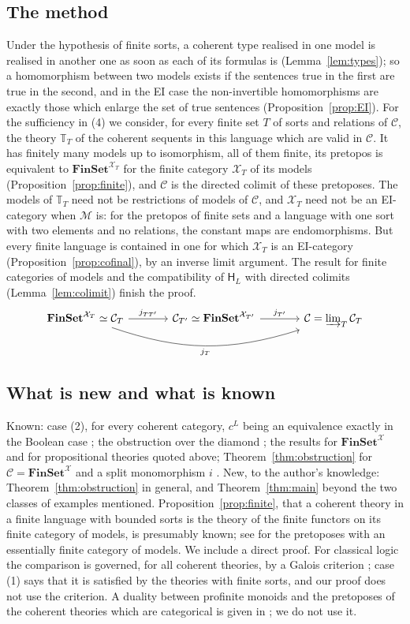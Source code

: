 \documentclass[11pt]{amsart}
\theoremstyle{definition}
\newcommand{\Fin}{\mathbf{FinSet}}
\newcommand{\HH}{\mathsf H}
\newcommand{\cX}{\mathcal X}
\newcommand{\cC}{\mathcal C}
\newcommand{\cM}{\mathcal M}
\newcommand{\bT}{\mathbb T}
\begin{document}
\subsection*{The method}
Under the hypothesis of finite sorts, a coherent type realised in one
model is realised in another one as soon as each of its formulas is
(Lemma~\ref{lem:types}); so a homomorphism between two models exists
if the sentences true in the first are true in the second, and in the
EI case the non-invertible homomorphisms are exactly those which
enlarge the set of true sentences (Proposition~\ref{prop:EI}). For
the sufficiency in (4) we consider, for every finite set $T$ of sorts
and relations of $\cC$, the theory $\bT_T$ of the coherent sequents
in this language which are valid in $\cC$. It has finitely many
models up to isomorphism, all of them finite, its pretopos is
equivalent to $\Fin^{\cX_T}$ for the finite category $\cX_T$ of its
models (Proposition~\ref{prop:finite}), and $\cC$ is the directed
colimit of these pretoposes. The models of $\bT_T$ need not be
restrictions of models of $\cC$, and $\cX_T$ need not be an
EI-category when $\cM$ is: for the pretopos of finite sets and a
language with one sort with two elements and no relations, the
constant maps are endomorphisms. But every finite language is
contained in one for which $\cX_T$ is an EI-category
(Proposition~\ref{prop:cofinal}), by an inverse limit argument. The result for finite categories of models
\cite{Strings} and the compatibility of $\HH_L$ with directed
colimits (Lemma~\ref{lem:colimit}) finish the proof.
\[
\begin{tikzcd}[column sep=large]
\Fin^{\cX_T}\simeq\cC_T\ar[r,"j_{TT'}"]\ar[rr,bend right=18,"j_T"']&
\cC_{T'}\simeq\Fin^{\cX_{T'}}\ar[r,"j_{T'}"]&\cC=\varinjlim_T\cC_T
\end{tikzcd}
\]

\subsection*{What is new and what is known}
Known: case (2), for every coherent category, $c^L$ being an
equivalence exactly in the Boolean case \cite[Thm.~1.1(1)]{Interm};
the obstruction over the diamond \cite[Prop.~5.1]{Interm}; the results
for $\Fin^{\cX}$ \cite{Strings,Classify} and for propositional
theories \cite{Interm,Classify} quoted above;
Theorem~\ref{thm:obstruction} for $\cC=\Fin^{\cX}$ and a split
monomorphism $i$ \cite[Thm.~3.1]{Classify}. New, to the author's
knowledge: Theorem~\ref{thm:obstruction} in general, and
Theorem~\ref{thm:main} beyond the two classes of examples mentioned.
Proposition~\ref{prop:finite}, that a coherent theory in a finite
language with bounded sorts is the theory of the finite functors on
its finite category of models, is presumably known; see
\cite[Cor.~2.6]{Ye24} for the pretoposes with an essentially finite
category of models. We include a direct proof. For classical logic the
comparison is governed, for all coherent theories, by a Galois
criterion \cite[Thm.~6.1]{Morley}; case (1) says that it is satisfied
by the theories with finite sorts, and our proof does not use the
criterion. A duality between
profinite monoids and the pretoposes of the coherent theories which
are categorical is given in \cite{Ye26}; we do not use it.
\end{document}
